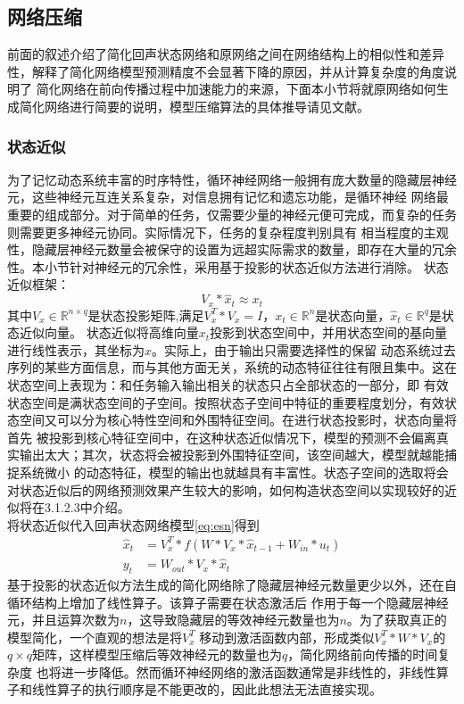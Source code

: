 \subsection{网络压缩}
前面的叙述介绍了简化回声状态网络和原网络之间在网络结构上的相似性和差异性，解释了简化网络模型预测精度不会显著下降的原因，并从计算复杂度的角度说明了
简化网络在前向传播过程中加速能力的来源，下面本小节将就原网络如何生成简化网络进行简要的说明，模型压缩算法的具体推导请见文献。
\subsubsection{状态近似}
为了记忆动态系统丰富的时序特性，循环神经网络一般拥有庞大数量的隐藏层神经元，这些神经元互连关系复杂，对信息拥有记忆和遗忘功能，是循环神经
网络最重要的组成部分。对于简单的任务，仅需要少量的神经元便可完成，而复杂的任务则需要更多神经元协同。实际情况下，任务的复杂程度判别具有
相当程度的主观性，隐藏层神经元数量会被保守的设置为远超实际需求的数量，即存在大量的冗余性。本小节针对神经元的冗余性，采用基于投影的状态近似方法进行消除。
状态近似框架：
\begin{equation}
	V_x * \widehat{x}_{t} \approx x_{t}
\end{equation}
其中\(V_x \in \mathbb{R}^{n \times q}\)是状态投影矩阵,满足\(V_x^T * V_x = I\)，\(x_{t} \in \mathbb{R}^n\)是状态向量，\(\widehat{x}_t \in \mathbb{R}^q\)是状态近似向量。
状态近似将高维向量\(x_t\)投影到状态空间中，并用状态空间的基向量进行线性表示，其坐标为\(\widehat{x}\)。实际上，由于输出只需要选择性的保留
动态系统过去序列的某些方面信息，而与其他方面无关，系统的动态特征往往有限且集中。这在状态空间上表现为：和任务输入输出相关的状态只占全部状态的一部分，即
有效状态空间是满状态空间的子空间。按照状态子空间中特征的重要程度划分，有效状态空间又可以分为核心特性空间和外围特征空间。在进行状态投影时，状态向量将首先
被投影到核心特征空间中，在这种状态近似情况下，模型的预测不会偏离真实输出太大；其次，状态将会被投影到外围特征空间，该空间越大，模型就越能捕捉系统微小
的动态特征，模型的输出也就越具有丰富性。状态子空间的选取将会对状态近似后的网络预测效果产生较大的影响，如何构造状态空间以实现较好的近似将在3.1.2.3中介绍。\\
将状态近似代入回声状态网络模型\ref{eq:esn}得到
\begin{equation}
	\begin{split}
		\widehat{x}_{t} & = V_x^T * f(W*V_x * \widehat{x}_{t-1} + W_{in} * u_t)	\\
					y_t & = W_{out} *V_x * \widehat{x}_t
	\end{split}
\end{equation}
基于投影的状态近似方法生成的简化网络除了隐藏层神经元数量更少以外，还在自循环结构上增加了线性算子。该算子需要在状态激活后
作用于每一个隐藏层神经元，并且运算次数为\(n\)，这导致隐藏层的等效神经元数量也为\(n\)。为了获取真正的模型简化，一个直观的想法是将\(V_x^T\)
移动到激活函数内部，形成类似\(V_x^T * W * V_x\)的\(q \times q\)矩阵，这样模型压缩后等效神经元的数量也为\(q\)，简化网络前向传播的时间复杂度
也将进一步降低。然而循环神经网络的激活函数通常是非线性的，非线性算子和线性算子的执行顺序是不能更改的，因此此想法无法直接实现。

